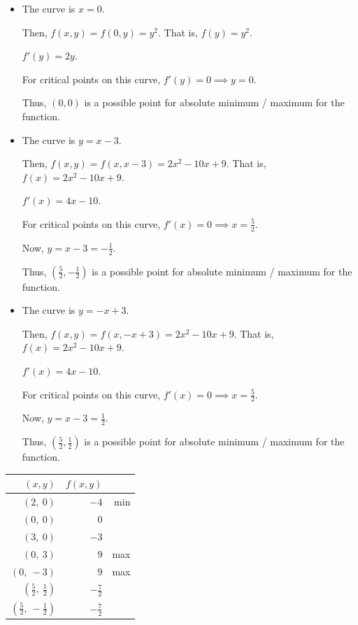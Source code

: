 \documentclass[11pt,fleqn]{book} %
\begin{document}
\begin{itemize}
    \item 
    
    The curve is $x = 0$. 

    Then, $f(x, y) = f(0, y) = y^2$. That is, $f(y) = y^2$. 

    $f'(y) = 2y$. 
        
    For critical points on this curve, $f'(y) = 0 \implies y = 0$. 

    Thus, $(0,0)$ is a possible point for absolute minimum / maximum for the function. 

    \item {\color{orange}
    
    The curve is $y = x - 3$. 

    Then, $f(x, y) = f(x, x-3) = 2x^2 - 10x + 9$. That is, $f(x) = 2x^2 - 10x + 9$.

    $f'(x) = 4x - 10$.

    For critical points on this curve, $f'(x) = 0 \implies x = \frac{5}{2}$. 

    Now, $y = x - 3 = -\frac{1}{2}$.

    Thus, $(\frac{5}{2}, -\frac{1}{2})$ is a possible point for absolute minimum / maximum for the function. 

    } \item \color{DarkGreen}
    
    The curve is $y = -x + 3$. 

    Then, $f(x, y) = f(x, -x+3) = 2x^2 - 10x + 9$. That is, $f(x) = 2x^2 - 10x + 9$.

    $f'(x) = 4x - 10$.

    For critical points on this curve, $f'(x) = 0 \implies x = \frac{5}{2}$. 

    Now, $y = x - 3 = \frac{1}{2}$.

    Thus, $(\frac{5}{2}, \frac{1}{2})$ is a possible point for absolute minimum / maximum for the function. 
\end{itemize}

\begin{center}
    \begin{tabular}{r | r r}
        $(x, y)$                      & $f(x, y)$            \\
        \hline
        $(2,~0)$                      & $-4$           & min \\
        $(0,~0)$                      & $0$                  \\
        $(3,~0)$                      & $-3$                 \\
        $(0,~3)$                      & $9$            & max \\
        $(0,~-3)$                     & $9$            & max \\
        \rule{0pt}{0.25cm}
        $(\frac{5}{2},~\frac{1}{2})$  & $-\frac{7}{2}$       \\
        \rule{0pt}{0.75cm}
        $(\frac{5}{2},~-\frac{1}{2})$ & $-\frac{7}{2}$       \\
    \end{tabular}
\end{center}
\end{document}
